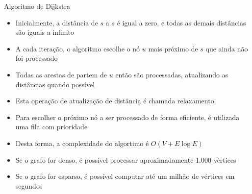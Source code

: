 \begin{frame}[fragile]{Algoritmo de Dijkstra}

    \begin{itemize}
        \item Inicialmente, a distância de $s$ a $s$ é igual a zero, e todas as demais
            distâncias são iguais a infinito

        \item A cada iteração, o algoritmo escolhe o nó $u$ mais próximo de $s$ que ainda não foi
            processado

        \item Todas as arestas de partem de $u$ então são processadas, atualizando as 
            distâncias quando possível

        \item Esta operação de atualização de distância é chamada relaxamento

        \item Para escolher o próximo nó a ser processado de forma eficiente, é utilizada uma
            fila com prioridade

        \item Desta forma, a complexidade do algortimo é $O(V + E\log E)$

        \item Se o grafo for denso, é possível processar aproximadamente 1.000 vértices

        \item Se o grafo for esparso, é possível computar até um milhão de vértices em
            segundos

    \end{itemize}

\end{frame}

